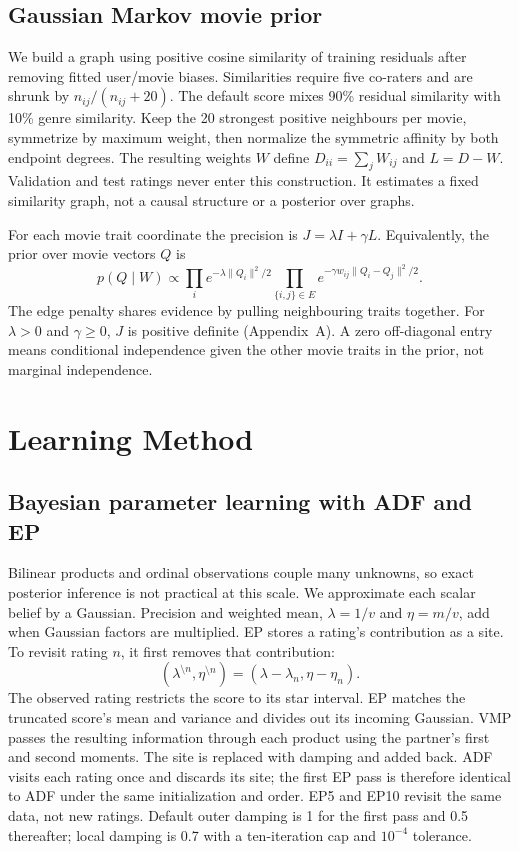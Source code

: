 \documentclass[11pt,a4paper]{article}
\begin{document}
\subsection{Gaussian Markov movie prior}
We build a graph using positive cosine similarity of training residuals
after removing fitted user/movie biases. Similarities require five
co-raters and are shrunk by $n_{ij}/(n_{ij}+20)$. The default score mixes
90\% residual similarity with 10\% genre similarity. Keep the 20 strongest
positive neighbours per movie, symmetrize by maximum weight, then normalize
the symmetric affinity by both endpoint degrees. The resulting weights $W$
define $D_{ii}=\sum_j W_{ij}$ and $L=D-W$. Validation and test ratings never
enter this construction. It estimates a fixed similarity graph, not a
causal structure or a posterior over graphs.

For each movie trait coordinate the precision is $J=\lambda I+\gamma L$.
Equivalently, the prior over movie vectors $Q$ is
\[
p(Q\mid W)\propto
\prod_i e^{-\lambda\|Q_i\|^2/2}
\prod_{\{i,j\}\in E}e^{-\gamma w_{ij}\|Q_i-Q_j\|^2/2}.
\]
The edge penalty shares evidence by pulling neighbouring traits together.
For $\lambda>0$ and $\gamma\ge0$, $J$ is positive definite (Appendix~A).
A zero off-diagonal entry means conditional independence given the other
movie traits in the prior, not marginal independence.

\clearpage
\section{Learning Method}
\subsection{Bayesian parameter learning with ADF and EP}
Bilinear products and ordinal observations couple many unknowns, so exact
posterior inference is not practical at this scale. We approximate each
scalar belief by a Gaussian. Precision and weighted mean, $\lambda=1/v$
and $\eta=m/v$, add when Gaussian factors are multiplied. EP stores a
rating's contribution as a site. To revisit rating $n$, it first removes
that contribution:
\[
(\lambda^{\setminus n},\eta^{\setminus n})=(\lambda-\lambda_n,\eta-\eta_n).
\]
The observed rating restricts the score to its star interval. EP matches
the truncated score's mean and variance and divides out its incoming
Gaussian. VMP passes the resulting information through each product using
the partner's first and second moments. The site is replaced with damping
and added back. ADF visits each rating once and discards its site; the first
EP pass is therefore identical to ADF under the same initialization and
order. EP5 and EP10 revisit the same data, not new ratings. Default outer
damping is 1 for the first pass and 0.5 thereafter; local damping is 0.7
with a ten-iteration cap and $10^{-4}$ tolerance.
\end{document}
